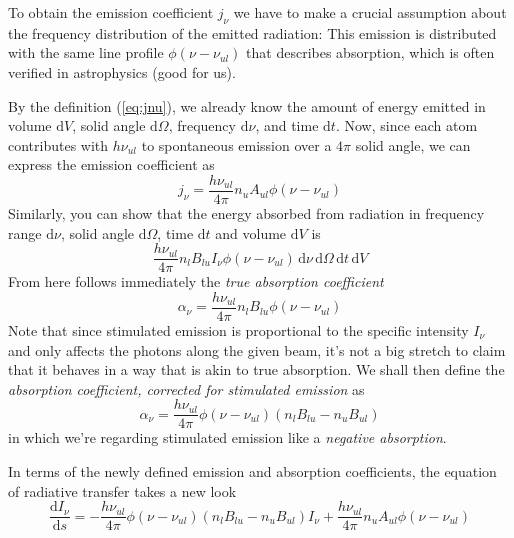 To obtain the emission coefficient $j_{\nu}$ we have to make a crucial assumption about the frequency distribution of the emitted radiation: This emission is distributed with the same line profile $\phi(\nu-\nu_{ul})$ that describes absorption, which is often verified in astrophysics (good for us).
\par By the definition (\ref{eq:jnu}), we already know the amount of energy emitted in volume $\text{d}V$, solid angle $\text{d}\Omega$, frequency $\text{d}\nu$, and time $\text{d}t$. Now, since each atom contributes with $h\nu_{ul}$ to spontaneous emission over a $4\pi$ solid angle, we can express the emission coefficient as 
\begin{equation}
    j_{\nu} = \frac{h\nu_{ul}}{4\pi}n_{u}A_{ul}\phi(\nu-\nu_{ul}) 
    \label{eq:jnueinstein}
\end{equation}
Similarly, you can show that the energy absorbed from radiation in frequency range $\text{d}\nu$, solid angle $\text{d}\Omega$, time $\text{d}t$ and volume $\text{d}V$ is
\begin{equation*}
    \frac{h\nu_{ul}}{4\pi}n_{l}B_{lu}I_{\nu}\phi(\nu-\nu_{ul})\,\text{d}\nu\,\text{d}\Omega\,\text{d}t\,\text{d}V
\end{equation*}
From here follows immediately the \emph{true absorption coefficient}
\begin{equation}
    \alpha_{\nu} = \frac{h\nu_{ul}}{4\pi}n_{l}B_{lu}\phi(\nu-\nu_{ul}) 
\end{equation}
Note that since stimulated emission is proportional to the specific intensity $I_{\nu}$ and only affects the photons along the given beam, it's not a big stretch to claim that it behaves in a way that is akin to true absorption. We shall then define the \emph{absorption coefficient, corrected for stimulated emission} as
\begin{equation}
    \alpha_{\nu} = \frac{h\nu_{ul}}{4\pi}\phi(\nu-\nu_{ul})(n_{l}B_{lu}-n_{u}B_{ul})
    \label{eq:alphacorrected}
\end{equation}
in which we're regarding stimulated emission like a \emph{negative absorption}.
\par In terms of the newly defined emission and absorption coefficients, the equation of radiative transfer takes a new look 
\begin{equation}
    \frac{\text{d}I_{\nu}}{\text{d}s} = -\frac{h\nu_{ul}}{4\pi}\phi(\nu-\nu_{ul})(n_{l}B_{lu}-n_{u}B_{ul})I_{\nu}+\frac{h\nu_{ul}}{4\pi}n_{u}A_{ul}\phi(\nu-\nu_{ul}) 
\end{equation}
